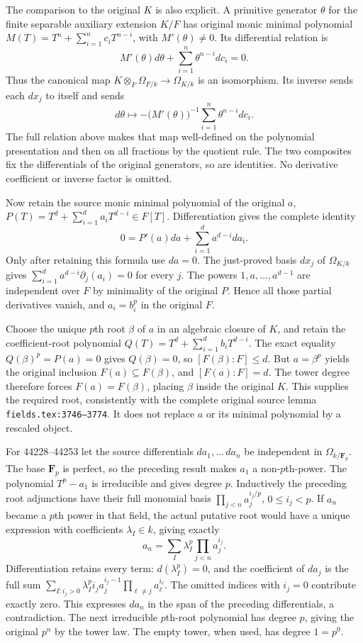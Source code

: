 The comparison to the original \(K\) is also explicit. A primitive generator \(\theta\) for the finite separable auxiliary extension \(K/F\) has original monic minimal polynomial \(M(T)=T^n+\sum_{i=1}^n c_iT^{n-i}\), with \(M'(\theta)\ne0\). Its differential relation is \[
 M'(\theta)d\theta+\sum_{i=1}^n\theta^{n-i}dc_i=0.
\] Thus the canonical map \(K\otimes_F\Omega_{F/k}\to\Omega_{K/k}\) is an isomorphism. Its inverse sends each \(dx_j\) to itself and sends \[
 d\theta\longmapsto-\bigl(M'(\theta)\bigr)^{-1}
                         \sum_{i=1}^n\theta^{n-i}dc_i.
\] The full relation above makes that map well-defined on the polynomial presentation and then on all fractions by the quotient rule. The two composites fix the differentials of the original generators, so are identities. No derivative coefficient or inverse factor is omitted.

Now retain the source monic minimal polynomial of the original \(a\), \(P(T)=T^d+\sum_{i=1}^d a_iT^{d-i}\in F[T]\). Differentiation gives the complete identity \[
 0=P'(a)da+\sum_{i=1}^d a^{d-i}da_i.
\] Only after retaining this formula use \(da=0\). The just-proved basis \(dx_j\) of \(\Omega_{K/k}\) gives \(\sum_{i=1}^d a^{d-i}\partial_j(a_i)=0\) for every \(j\). The powers \(1,a,\ldots,a^{d-1}\) are independent over \(F\) by minimality of the original \(P\). Hence all those partial derivatives vanish, and \(a_i=b_i^p\) in the original \(F\).

Choose the unique \(p\)th root \(\beta\) of \(a\) in an algebraic closure of \(K\), and retain the coefficient-root polynomial \(Q(T)=T^d+\sum_{i=1}^d b_iT^{d-i}\). The exact equality \(Q(\beta)^p=P(a)=0\) gives \(Q(\beta)=0\), so \([F(\beta):F]\leq d\). But \(a=\beta^p\) yields the original inclusion \(F(a)\subseteq F(\beta)\), and \([F(a):F]=d\). The tower degree therefore forces \(F(a)=F(\beta)\), placing \(\beta\) inside the original \(K\). This supplies the required root, consistently with the complete original source lemma \texttt{fields.tex:3746–3774}. It does not replace \(a\) or its minimal polynomial by a rescaled object.

For 44228--44253 let the source differentials \(da_1,\ldots\,da_n\) be independent in \(\Omega_{k/\mathbf F_p}\). The base \(\mathbf F_p\) is perfect, so the preceding result makes \(a_1\) a non-\(p\)th-power. The polynomial \(T^p-a_1\) is irreducible and gives degree \(p\). Inductively the preceding root adjunctions have their full monomial basis \(\prod_{j<n}a_j^{i_j/p}\), \(0\leq i_j<p\). If \(a_n\) became a \(p\)th power in that field, the actual putative root would have a unique expression with coefficients \(\lambda_I\in k\), giving exactly \[
 a_n=\sum_I\lambda_I^p\prod_{j<n}a_j^{i_j}.
\] Differentiation retains every term: \(d(\lambda_I^p)=0\), and the coefficient of \(da_j\) is the full sum \(\sum_{I:i_j>0}\lambda_I^p i_j a_j^{i_j-1}\prod_{\ell\ne j}a_\ell^{i_\ell}\). The omitted indices with \(i_j=0\) contribute exactly zero. This expresses \(da_n\) in the span of the preceding differentials, a contradiction. The next irreducible \(p\)th-root polynomial has degree \(p\), giving the original \(p^n\) by the tower law. The empty tower, when used, has degree \(1=p^0\).

